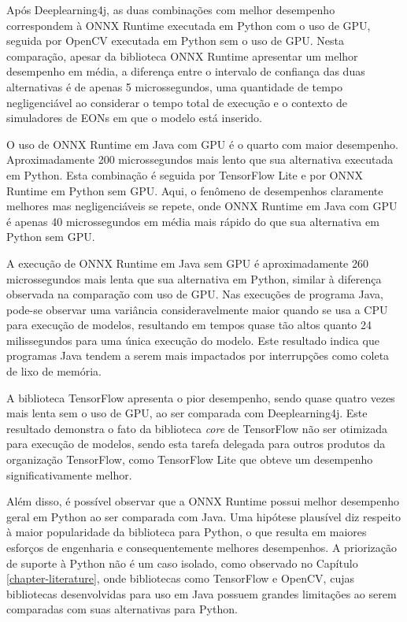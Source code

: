 Após Deeplearning4j, as duas combinações com melhor desempenho correspondem à ONNX Runtime executada em Python com o uso de GPU, seguida por OpenCV executada em Python sem o uso de GPU. Nesta comparação, apesar da biblioteca ONNX Runtime apresentar um melhor desempenho em média, a diferença entre o intervalo de confiança das duas alternativas é de apenas 5 microssegundos, uma quantidade de tempo negligenciável ao considerar o tempo total de execução e o contexto de simuladores de EONs em que o modelo está inserido.

O uso de ONNX Runtime em Java com GPU é o quarto com maior desempenho. Aproximadamente 200 microssegundos mais lento que sua alternativa executada em Python. Esta combinação é seguida por TensorFlow Lite e por ONNX Runtime em Python sem GPU. Aqui, o fenômeno de desempenhos claramente melhores mas negligenciáveis se repete, onde ONNX Runtime em Java com GPU é apenas 40 microssegundos em média mais rápido do que sua alternativa em Python sem GPU.

A execução de ONNX Runtime em Java sem GPU é aproximadamente 260 microssegundos mais lenta que sua alternativa em Python, similar à diferença observada na comparação com uso de GPU. Nas execuções de programa Java, pode-se observar uma variância consideravelmente maior quando se usa a CPU para execução de modelos, resultando em tempos quase tão altos quanto 24 milissegundos para uma única execução do modelo. Este resultado indica que programas Java tendem a serem mais impactados por interrupções como coleta de lixo de memória.

A biblioteca TensorFlow apresenta o pior desempenho, sendo quase quatro vezes mais lenta sem o uso de GPU, ao ser comparada com Deeplearning4j. Este resultado demonstra o fato da biblioteca \textit{core} de TensorFlow não ser otimizada para execução de modelos, sendo esta tarefa delegada para outros produtos da organização TensorFlow, como TensorFlow Lite que obteve um desempenho significativamente melhor.

Além disso, é possível observar que a ONNX Runtime possui melhor desempenho geral em Python ao ser comparada com Java. Uma hipótese plausível diz respeito à maior popularidade da biblioteca para Python, o que resulta em maiores esforços de engenharia e consequentemente melhores desempenhos. A priorização de suporte à Python não é um caso isolado, como observado no Capítulo \ref{chapter-literature}, onde bibliotecas como TensorFlow e OpenCV, cujas bibliotecas desenvolvidas para uso em Java possuem grandes limitações ao serem comparadas com suas alternativas para Python.

